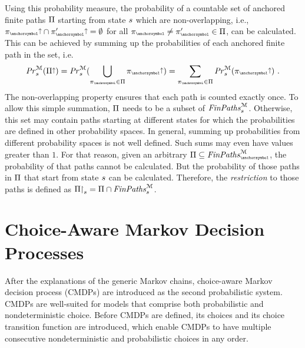 Using this probability measure, the probability of a countable set of anchored finite paths $\Pi$ starting from state $s$ which are non-overlapping, i.e., $\Cylinder{\ancfinpath} \cap \Cylinder{\ancfinpath'} = \emptyset$ for all $\ancfinpath \neq \ancfinpath' \in \AncFinPathsOfInterest$, can be calculated.
This can be achieved by summing up the probabilities of each anchored finite path in the set, i.e.
\begin{equation*}
	\McProbInState{\state}(\Cylinder{\AncFinPathsOfInterest}) =
	\McProbInState{\state}(\bigdjunion_{\ancfinpath\in\AncFinPathsOfInterest} \Cylinder{\ancfinpath}) =
	\sum_{\ancfinpath \in \AncFinPathsOfInterest} \McProbInState{\state}(\Cylinder{\ancfinpath})
	\ \text{.}
\end{equation*}
The non-overlapping property ensures that each path is counted exactly once.
%
To allow this simple summation, $\Pi$ needs to be a subset of $\mathit{FinPaths}_{s}^{\mathcal{M}}$.
Otherwise, this set may contain paths starting at different states for which the probabilities are defined in other probability spaces.
In general, summing up probabilities from different probability spaces is not well defined.
Such sums may even have values greater than $1$.
%
For that reason, given an arbitrary $\AncFinPathsOfInterest \subseteq \McAncFinPaths$, the probability of that paths cannot be calculated.
But the probability of those paths in $\Pi$ that start from state $s$ can be calculated.
Therefore, the \emph{restriction} to those paths is defined as ${\Pi\mathop{\hspace{-0.2em}\upharpoonright^{}_{s}}} = \Pi \cap \mathit{FinPaths}_{s}^{\mathcal{M}}$.






\newpage
\section{Choice-Aware Markov Decision Processes}\label{sec:FormalFoundations:CMDP}

After the explanations of the generic Markov chains, choice-aware Markov decision process (CMDPs) are introduced as the second probabilistic system.
CMDPs are well-suited for models that comprise both probabilistic and nondeterministic choice.
Before CMDPs are defined, its choices and its choice transition function are introduced, which enable CMDPs to have multiple consecutive nondeterministic and probabilistic choices in any order.

